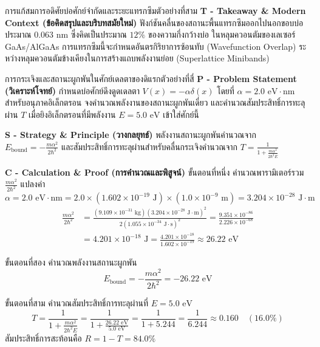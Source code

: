 \begin{psctbox}{การแก้สมการอดิศัยบ่อศักย์จำกัดและระยะแทรกซึม}{ตัวอย่างที่สาม}
\vspace{6pt}
\noindent\textbf{T - Takeaway \& Modern Context (ข้อคิดสรุปและบริบทสมัยใหม่)} ฟังก์ชันคลื่นของสถานะพื้นแทรกซึมออกไปนอกขอบบ่อประมาณ $0.063\text{ nm}$ ซึ่งคิดเป็นประมาณ $12\%$ ของความกึ่งกว้างบ่อ ในหลุมควอนตัมของเลเซอร์ GaAs/AlGaAs การแทรกซึมนี้จะกำหนดอันตรกิริยาการซ้อนทับ (Wavefunction Overlap) ระหว่างหลุมควอนตัมข้างเคียงในการสร้างแถบพลังงานย่อย (Superlattice Minibands)
\end{psctbox}

\begin{psctbox}{การกระเจิงและสถานะผูกพันในศักย์เดลตาของดิแรก}{ตัวอย่างที่สี่}
\noindent\textbf{P - Problem Statement (วิเคราะห์โจทย์)} กำหนดบ่อศักย์ดึงดูดเดลตา $V(x) = -\alpha\delta(x)$ โดยที่ $\alpha = 2.0\text{ eV}\cdot\text{nm}$ สำหรับอนุภาคอิเล็กตรอน จงคำนวณพลังงานของสถานะผูกพันเดี่ยว และคำนวณสัมประสิทธิ์การทะลุผ่าน $T$ เมื่อยิงอิเล็กตรอนที่มีพลังงาน $E = 5.0\text{ eV}$ เข้าใส่ศักย์นี้

\vspace{6pt}
\noindent\textbf{S - Strategy \& Principle (วางกลยุทธ์)} พลังงานสถานะผูกพันคำนวณจาก $E_{\text{bound}} = -\frac{m\alpha^2}{2\hbar^2}$ และสัมประสิทธิ์การทะลุผ่านสำหรับคลื่นกระเจิงคำนวณจาก $T = \frac{1}{1 + \frac{m\alpha^2}{2\hbar^2 E}}$

\vspace{6pt}
\noindent\textbf{C - Calculation \& Proof (การคำนวณและพิสูจน์)}
ขั้นตอนที่หนึ่ง คำนวณพารามิเตอร์รวม $\frac{m\alpha^2}{2\hbar^2}$
แปลงค่า $\alpha = 2.0\text{ eV}\cdot\text{nm} = 2.0 \times (1.602 \times 10^{-19}\text{ J}) \times (1.0 \times 10^{-9}\text{ m}) = 3.204 \times 10^{-28}\text{ J}\cdot\text{m}$
\begin{align}
\frac{m\alpha^2}{2\hbar^2} &= \frac{(9.109 \times 10^{-31}\text{ kg})(3.204 \times 10^{-28}\text{ J}\cdot\text{m})^2}{2(1.055 \times 10^{-34}\text{ J}\cdot\text{s})^2} = \frac{9.351 \times 10^{-86}}{2.226 \times 10^{-68}} \\
&= 4.201 \times 10^{-18}\text{ J} = \frac{4.201 \times 10^{-18}}{1.602 \times 10^{-19}} \approx 26.22\text{ eV}
\end{align}

ขั้นตอนที่สอง คำนวณพลังงานสถานะผูกพัน
\begin{equation}
E_{\text{bound}} = -\frac{m\alpha^2}{2\hbar^2} = -26.22\text{ eV}
\end{equation}

ขั้นตอนที่สาม คำนวณสัมประสิทธิ์การทะลุผ่านที่ $E = 5.0\text{ eV}$
\begin{equation}
T = \frac{1}{1 + \frac{m\alpha^2}{2\hbar^2 E}} = \frac{1}{1 + \frac{26.22\text{ eV}}{5.0\text{ eV}}} = \frac{1}{1 + 5.244} = \frac{1}{6.244} \approx 0.160 \quad (16.0\%)
\end{equation}
สัมประสิทธิ์การสะท้อนคือ $R = 1 - T = 84.0\%$


\end{psctbox}
